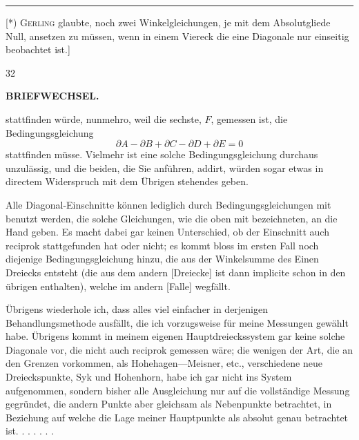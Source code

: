 \par\noindent\rule{4cm}{.4pt}\par
{\footnotesize\noindent\hspace*{\parindent}[*) \textsc{Gerling} glaubte, noch zwei Winkelgleichungen, je mit dem Absolutgliede Null, ansetzen zu müssen, wenn in einem Viereck die eine Diagonale nur einseitig beobachtet ist.]\par}
\hfill{\small 32}\hspace*{.12\linewidth}\par

\par\clearpage
\noindent{}\hfill{\small\textbf{BRIEFWECHSEL.}}\hfill\null\par\medskip

\noindent stattfinden würde, nunmehro, weil die sechste, \(F\),  gemessen ist, die Bedingungsgleichung
\[
 \partial A-\partial B+\partial C-\partial D+\partial E=0
\]
\noindent stattfinden müsse. Vielmehr ist eine solche Bedingungsgleichung durchaus unzulässig, und die beiden, die Sie anführen, addirt, würden sogar etwas in directem Widerspruch mit dem Übrigen stehendes geben.

Alle Diagonal-Einschnitte können lediglich durch  Bedingungsgleichungen mit benutzt werden, die solche Gleichungen, wie die oben mit \mbox{} bezeichneten, an die Hand geben. Es macht dabei gar keinen Unterschied, ob der Einschnitt auch reciprok stattgefunden hat oder nicht; es kommt bloss im ersten Fall noch diejenige Bedingungsgleichung hinzu, die aus der Winkelsumme des Einen Dreiecks entsteht (die aus dem andern [Dreiecke] ist dann implicite schon in den übrigen enthalten), welche im andern [Falle] wegfällt.

Übrigens wiederhole ich, dass alles viel einfacher in derjenigen Behandlungsmethode ausfällt, die ich vorzugsweise für meine Messungen gewählt habe. Übrigens kommt in meinem eigenen Hauptdreieckssystem gar keine solche Diagonale vor, die nicht auch reciprok gemessen wäre; die wenigen der Art, die an den Grenzen vorkommen, als Hohehagen—Meisner, etc., verschiedene neue Dreieckspunkte, Syk und Hohenhorn, habe ich gar nicht ins System aufgenommen, sondern bisher alle Ausgleichung nur auf die vollständige Messung gegründet, die andern Punkte aber gleichsam als Nebenpunkte betrachtet, in Beziehung auf welche die Lage meiner Hauptpunkte als absolut genau betrachtet ist. . . . . . .

